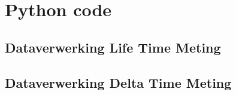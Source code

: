 \chapter{Python code}
\section{Dataverwerking Life Time Meting}
\label{Bijlage2DataverwerkingLifeTimeMeting}


\section{Dataverwerking Delta Time Meting}
\label{Bijlage2DataverwerkingLifeTimeMeting}
